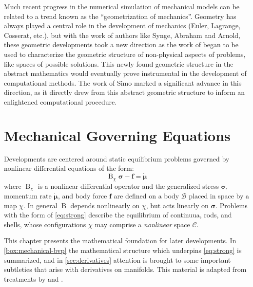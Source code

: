 
Much recent progress in the numerical simulation of mechanical models can be
related to a trend known as the ``geometrization of mechanics''.
Geometry has always played a central role in the development of
mechanics (Euler, Lagrange, Cosserat, etc.),
but with 
the work of authors like Synge, Abraham and Arnold, these geometric 
developments took a new direction as 
% 
the work of \cite{ricci1901methodes} began to be used to
characterize the geometric structure of non-physical aspects of
problems, like spaces of possible solutions.
This newly found geometric structure in the abstract mathematics would
eventually prove instrumental in the development of computational
methods. 
The work of Simo \citep{simo1986threedimensional,simo1990stress} marked a significant advance in this
direction, as it directly drew from this abstract geometric structure to
inform an enlightened computational procedure.

%
\hypertarget{sec:apparatus}{%
\section{Mechanical Governing Equations}\label{sec:apparatus}}
Developments are centered around static equilibrium problems %
governed by nonlinear differential equations of the form:
\begin{equation}
\operatorname{B}_\chi \bm{\sigma} - \bm{f} = \dot{\bm{\mu}}
\label{eq:strong}
\end{equation}
where \(\operatorname{B}_\chi\) is a nonlinear
differential operator and the generalized stress \(\boldsymbol{\sigma}\), momentum rate \(\dot{\bm{\mu}}\), and body force \(\bm{f}\) are defined on a body \(\mathcal{B}\) placed in space by a
map \(\chi\). 
In general \(\operatorname{B}\) depends nonlinearly on \(\chi\),
but acts linearly on \(\boldsymbol{\sigma}\). Problems with the form of
\eqref{eq:strong} describe the equilibrium of continuua, rods, and shells, whose
configurations \(\chi\) may comprise a \emph{nonlinear} space
\(\mathscr{C}\).

This chapter presents the mathematical foundation for later developments. In
\cref{box:mechanical-bvp} the mathematical structure which underpins
\eqref{eq:strong} is summarized, and in \cref{sec:derivatives} attention
is brought to some important subtleties that arise with derivatives on manifolds. 
This material is adapted from treatments by \cite{marsden1994mathematical,zienkiewicz2014finite,ogden1997nonlinear} and \cite{shilov1996elementary}.

